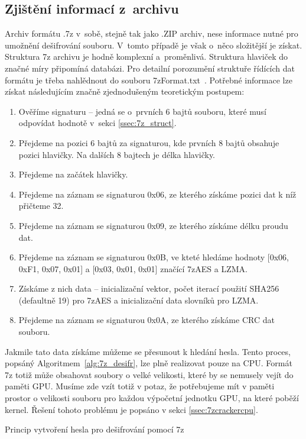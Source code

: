 \subsection{Zjištění informací z~archivu}
Archiv formátu .7z v~sobě, stejně tak jako .ZIP archiv, nese informace nutné pro umožnění
dešifrování souboru. V~tomto případě je však o~něco složitější je získat. Struktura 7z archivu
je hodně komplexní a~proměnlivá. Struktura hlaviček do značné míry připomíná databázi. Pro
detailní porozumění struktuře řídících dat formátu je třeba nahlědnout do souboru
7zFormat.txt~\cite{Pavlov:2010}. Potřebné informace lze získat následujícím značně zjednodušeným
teoretickým postupem:
\begin{enumerate}
    \item Ověříme signaturu -- jedná se o~prvních 6 bajtů souboru, které musí odpovídat hodnotě
v~sekci \ref{ssec:7z_struct}. 
    \item Přejdeme na pozici 6 bajtů za signaturou, kde	prvních 8 bajtů obsahuje pozici hlavičky.
	Na dalších 8 bajtech je délka hlavičky.
    \item Přejdeme na začátek hlavičky.
    \item Přejdeme na záznam se signaturou 0x06, ze kterého získáme pozici dat k níž přičteme 32.
    \item Přejdeme na záznam se signaturou 0x09, ze kterého získáme délku proudu dat.
    \item Přejdeme na záznam se signaturou 0x0B, ve kteté hledáme hodnoty [0x06, 0xF1, 0x07, 0x01]
	a [0x03, 0x01, 0x01] značící 7zAES a LZMA.
    \item Získáme z nich data -- inicializační vektor, počet iterací použití SHA256 (defaultně
	19) pro 7zAES a inicializační data slovníků pro LZMA.
    \item Přejdeme na záznam se signaturou 0x0A, ze kterého získáme CRC dat souboru.
\end{enumerate}
Jakmile tato data získáme můžeme se přesunout k hledání hesla. Tento proces, popsáný
Algoritmem~\ref{alg:7z_desifr}, lze plně realizovat pouze na CPU. Formát 7z totiž může obsahovat
soubory o velké velikosti, které by se nemusely vejít do paměti GPU. Musíme zde vzít totiž v
potaz, že potřebujeme mít v paměti prostor o velikosti souboru pro každou výpočetní jednotku GPU,
na které poběží kernel. Řešení tohoto problému je popsáno v sekci \ref{ssec:7zcrackercpu}.

\begin{algorithm}[ht]
    \SetStartEndCondition{ (}{)}{)}\SetAlgoBlockMarkers{}{}%
    \AlgoDisplayBlockMarkers\SetAlgoNoLine%
    \DontPrintSemicolon
    \caption{Princip vytvoření hesla pro dešifrování pomocí 7z}\label{alg:7z_desifr}
\end{algorithm}
    
